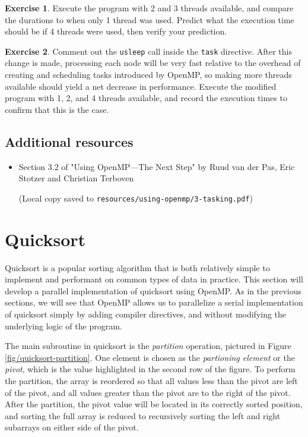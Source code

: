 \documentclass{article}
\newcommand{\resource}[1]{(Local copy saved to \texttt{#1})}
\theoremstyle{definition}
\newtheorem{exercise}{Exercise}
\begin{document}
\begin{exercise}
Execute the program with 2 and 3 threads available, and compare the durations to when only 1 thread was used. Predict what the execution time should be if 4 threads were used, then verify your prediction.
\end{exercise}

\begin{exercise}
Comment out the \texttt{usleep} call inside the \texttt{task} directive. After this change is made, processing each node will be very fast relative to the overhead of creating and scheduling tasks introduced by OpenMP, so making more threads available should yield a net decrease in performance. Execute the modified program with 1, 2, and 4 threads available, and record the execution times to confirm that this is the case.  
\end{exercise}

\subsection*{Additional resources}

\begin{itemize}
    \item Section 3.2 of "Using OpenMP—The Next Step" by Ruud van der Pas, Eric Stotzer and Christian Terboven
    
    \resource{resources/using-openmp/3-tasking.pdf}
\end{itemize}

\section{Quicksort}

Quicksort is a popular sorting algorithm that is both relatively simple to implement and performant on common types of data in practice. This section will develop a parallel implementation of quicksort using OpenMP. As in the previous sections, we will see that OpenMP allows us to parallelize a serial implementation of quicksort simply by adding compiler directives, and without modifying the underlying logic of the program.

The main subroutine in quicksort is the \emph{partition} operation, pictured in Figure \ref{fig/quicksort-partition}. One element is chosen as the \emph{partioning element} or the \emph{pivot}, which is the value highlighted in the second row of the figure. To perform the partition, the array is reordered so that all values less than the pivot are left of the pivot, and all values greater than the pivot are to the right of the pivot. After the partition, the pivot value will be located in its correctly sorted position, and sorting the full array is reduced to recursively sorting the left and right subarrays on either side of the pivot.
\end{document}
